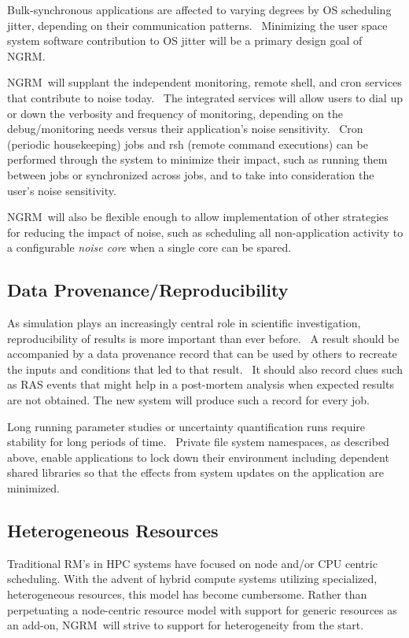 \documentclass{article}
\newcommand{\ngrm}{NGRM}
\begin{document}
Bulk-synchronous applications are affected to varying degrees by OS
scheduling jitter, depending on their communication patterns.  Minimizing
the user space system software contribution to OS jitter will be a primary
design goal of \ngrm.

\ngrm\ will supplant the independent monitoring, remote shell, and cron
services that contribute to noise today.  The integrated services will
allow users to dial up or down the verbosity and frequency of monitoring,
depending on the debug/monitoring needs versus their application’s noise
sensitivity.  Cron (periodic housekeeping) jobs and rsh (remote command
executions) can be performed through the system to minimize their impact,
such as running them between jobs or synchronized across jobs, and to
take into consideration the user's noise sensitivity.

\ngrm\ will also be flexible enough to allow implementation of other
strategies for reducing the impact of noise, such as scheduling all
non-application activity to a configurable {\em noise core} when a
single core can be spared.

\subsection{Data Provenance/Reproducibility}

As simulation plays an increasingly central role in scientific
investigation, reproducibility of results is more important than ever
before.  A result should be accompanied by a data provenance record that
can be used by others to recreate the inputs and conditions that led to
that result.  It should also record clues such as RAS events that might
help in a post-mortem analysis when expected results are not obtained.
The new system will produce such a record for every job.

Long running parameter studies or uncertainty quantification runs
require stability for long periods of time.  Private file system
namespaces, as described above, enable applications to lock down their
environment including dependent shared libraries so that the effects from
system updates on the application are minimized.

\subsection{Heterogeneous Resources}

Traditional RM's in HPC systems have focused on node and/or CPU centric
scheduling. With the advent of hybrid compute systems utilizing specialized,
heterogeneous resources, this model has become cumbersome. Rather than
perpetuating a node-centric resource model with support for generic
resources as an add-on, \ngrm\ will strive to support for heterogeneity
from the start.
\end{document}
